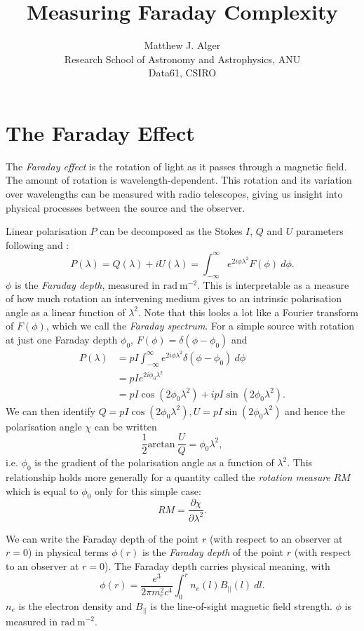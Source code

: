 \documentclass[a4paper]{article}
\title{Measuring Faraday Complexity}
\author{Matthew J. Alger\\{\small Research School of Astronomy and Astrophysics, ANU}\\{\small Data61, CSIRO}}
\newcommand{\defn}[1]{\emph{#1}}
\begin{document}
    \maketitle

    \section{The Faraday Effect}

    The \defn{Faraday effect} is the rotation of light as it passes through a magnetic field. The amount of rotation is wavelength-dependent. This rotation and its variation over wavelengths can be measured with radio telescopes, giving us insight into physical processes between the source and the observer.

    Linear polarisation $P$ can be decomposed as the Stokes $I$, $Q$ and $U$ parameters following \citet{burn66depolarization} and \citet{bell12faraday}:
    \[
        P(\lambda) = Q(\lambda) + iU(\lambda) = \int_{-\infty}^{\infty} e^{2i\phi\lambda^2} F(\phi)\ d\phi.
    \]
    $\phi$ is the \defn{Faraday depth}, measured in $\mathrm{rad}\ \mathrm{m}^{-2}$. This is interpretable as a measure of how much rotation an intervening medium gives to an intrinsic polarisation angle as a linear function of $\lambda^2$. Note that this looks a lot like a Fourier transform of $F(\phi)$, which we call the \defn{Faraday spectrum}. For a simple source with rotation at just one Faraday depth $\phi_0$, $F(\phi) = \delta(\phi - \phi_0)$ and
    \begin{align*}
        P(\lambda) &= pI \int_{-\infty}^{\infty} e^{2i\phi\lambda^2} \delta(\phi - \phi_0)\ d\phi\\
            &= pI e^{2i\phi_0\lambda^2}\\
            &= pI \cos (2\phi_0\lambda^2) + i pI \sin (2\phi_0\lambda^2).
    \end{align*}
    We can then identify $Q = pI \cos(2 \phi_0 \lambda^2), U = pI \sin(2 \phi_0 \lambda^2)$ and hence the polarisation angle $\chi$ can be written
    \[
        \frac{1}{2} \mathrm{arctan}\ \frac{U}{Q} = \phi_0 \lambda^2,
    \]
    i.e. $\phi_0$ is the gradient of the polarisation angle as a function of $\lambda^2$. This relationship holds more generally for a quantity called the \defn{rotation measure} $RM$ which is equal to $\phi_0$ only for this simple case:
    \[
        RM = \frac{\partial \chi}{\partial \lambda^2}.
    \]

    We can write the Faraday depth of the point $r$ (with respect to an observer at $r = 0$) in physical terms $\phi(r)$ is the \defn{Faraday depth} of the point $r$ (with respect to an observer at $r = 0$). The Faraday depth carries physical meaning, with
    \[
        \phi(r) = \frac{e^3}{2\pi m_e^2 c^4} \int_0^r n_e(l) B_{||}(l)\ dl.
    \]
    $n_e$ is the electron density and $B_{||}$ is the line-of-sight magnetic field strength. $\phi$ is measured in $\mathrm{rad}\ \mathrm{m}^{-2}$.
\end{document}
